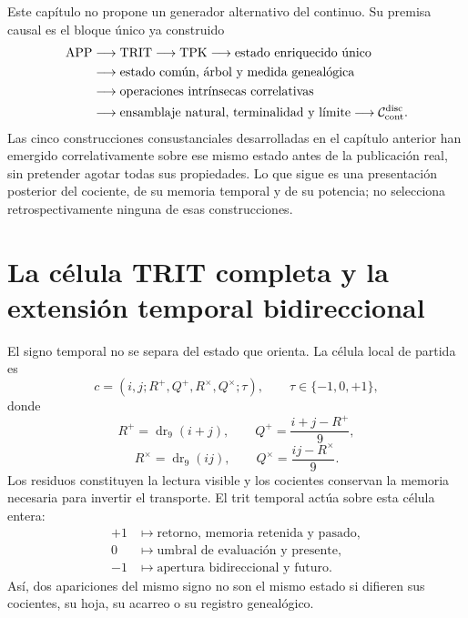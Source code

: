 \label{chap:83-19}

Este capítulo no propone un generador alternativo del continuo. Su premisa
causal es el bloque único ya construido
\[
 \begin{aligned}
 \mathrm{APP}&\longrightarrow\mathrm{TRIT}\longrightarrow\mathrm{TPK}
 \longrightarrow\text{estado enriquecido único}\\
 &\longrightarrow\text{estado común, árbol y medida genealógica}\\
 &\longrightarrow\text{operaciones intrínsecas correlativas}\\
 &\longrightarrow\text{ensamblaje natural, terminalidad y límite}
 \longrightarrow\mathcal C_{\rm cont}^{\rm disc}.
 \end{aligned}
\]
Las cinco construcciones consustanciales desarrolladas en el capítulo
anterior han emergido correlativamente sobre ese mismo estado antes de la
publicación real, sin pretender agotar todas sus propiedades. Lo que sigue es una presentación
posterior del cociente, de su memoria temporal y de su potencia; no selecciona
retrospectivamente ninguna de esas construcciones.

\section{La célula TRIT completa y la extensión temporal bidireccional}

El signo temporal no se separa del estado que orienta. La célula local de
partida es
\begin{equation}
 c=(i,j;R^+,Q^+,R^\times,Q^\times;\tau),
 \qquad \tau\in\{-1,0,+1\},
 \label{p12-83-c19-s1:hmtch:eq-celula-trit-completa}
\end{equation}
donde
\[
 R^+=\operatorname{dr}_9(i+j),\qquad
 Q^+=\frac{i+j-R^+}{9},
\]
\[
 R^\times=\operatorname{dr}_9(ij),\qquad
 Q^\times=\frac{ij-R^\times}{9}.
\]
Los residuos constituyen la lectura visible y los cocientes conservan la
memoria necesaria para invertir el transporte. El trit temporal actúa sobre
esta célula entera:
\begin{equation}
\begin{aligned}
 +1&\longmapsto \text{retorno, memoria retenida y pasado},\\
 0&\longmapsto \text{umbral de evaluación y presente},\\
 -1&\longmapsto \text{apertura bidireccional y futuro}.
\end{aligned}
\label{p12-83-c19-s1:hmtch:eq-lector-temporal-trit}
\end{equation}
Así, dos apariciones del mismo signo no son el mismo estado si difieren sus
cocientes, su hoja, su acarreo o su registro genealógico.


